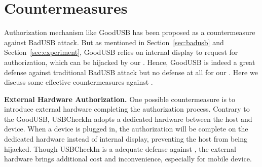 \section{Countermeasures}

\label{sec:countermeasures}
Authorization mechanism like GoodUSB\cite{tian2015defending} has been proposed as a countermeasure against BadUSB attack. But as mentioned in Section~\ref{sec:badusb} and Section~\ref{sec:experiment}, GoodUSB relies on internal display to request for authorization, which can be hijacked by our \tool. Hence, GoodUSB is indeed a great defense against traditional BadUSB attack but no defense at all for our \tool. Here we discuss some effective countermeasures against \tool.

\textbf{External Hardware Authorization.}
One possible countermeasure is to introduce external hardware completing the authorization process. Contrary to the GoodUSB, USBCheckIn\cite{usbcheckin} adopts a dedicated hardware between the host and device. When a device is plugged in, the authorization will be complete on the dedicated hardware instead of internal display, preventing the host from being hijacked. Though USBCheckIn is a adequate defense against \tool, the external hardware brings additional cost and inconvenience, especially for mobile device.


